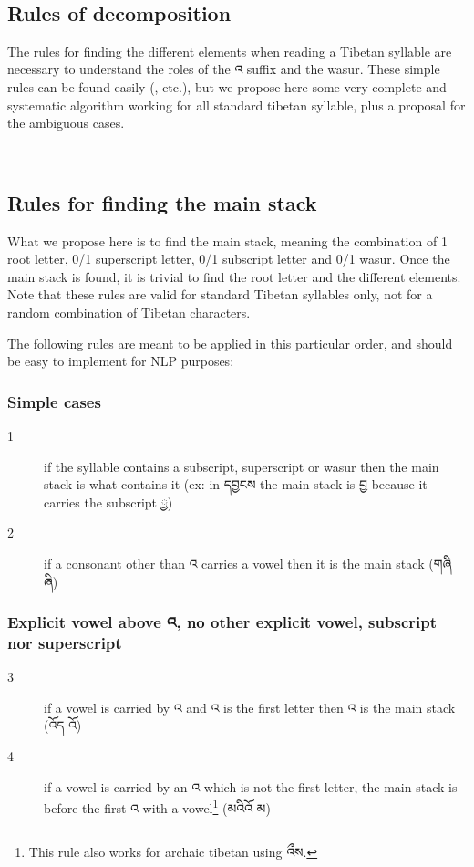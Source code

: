 \documentclass[%
a4paper,%
pagesize,%
12pt,%
parskip=off,%
bibliography=totoc,%
numbers=noenddot,%
DIV=12,%
twoside=semi,%
headings=normal%
]{scrartcl}
\begin{document}
­\subsection{Rules of decomposition}

The rules for finding the different elements when reading a Tibetan syllable are necessary to understand the roles of the འ suffix and the wasur. These simple rules can be found easily (\cite{TournadreMST}, etc.), but we propose here some very complete and systematic algorithm working for all standard tibetan syllable, plus a proposal for the ambiguous cases.

­\subsection{Rules for finding the main stack}

What we propose here is to find the main stack, meaning the combination of 1 root letter, 0/1 superscript letter, 0/1 subscript letter and 0/1 wasur. Once the main stack is found, it is trivial to find the root letter and the different elements. Note that these rules are valid for standard Tibetan syllables only, not for a random combination of Tibetan characters.

The following rules are meant to be applied in this particular order, and should be easy to implement for NLP purposes:

\subsubsection*{Simple cases}\label{decompositionrules}

\begin{description}
\item[1] if the syllable contains a subscript, superscript or wasur then the main stack is what contains it (ex: in དབྱངས the main stack is བྱ because it carries the subscript ྱ)
\item[2] if a consonant other than འ carries a vowel then it is the main stack (གཞི \rightarrow{} ཞི)
\end{description}

\subsubsection*{Explicit vowel above འ, no other explicit vowel, subscript nor superscript}

\begin{description}
\item[3] if a vowel is carried by འ and འ is the first letter then འ is the main stack (འོད \rightarrow{} འོ)
\item[4] if a vowel is carried by an འ which is not the first letter, the main stack is before the first འ with a vowel\footnote{This rule also works for archaic tibetan using འྀས.} (མའིའོ \rightarrow{} མ)
\end{description}
\end{document}
